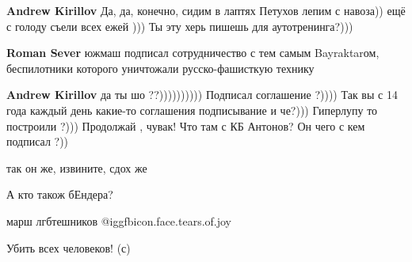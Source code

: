 \begin{itemize}
\begin{itemize}
\textbf{Andrew Kirillov} Да, да, конечно, сидим в лаптях Петухов лепим с навоза)) ещё с голоду съели всех ежей )))
Ты эту херь пишешь для аутотренинга?)))

\textbf{Roman Sever} южмаш подписал сотрудничество с тем самым Bayraktarом, беспилотники которого уничтожали русско-фашисткую технику

\textbf{Andrew Kirillov} да ты шо ??))))))))))
Подписал соглашение ?))))
Так вы с 14 года каждый день какие-то соглашения подписывание и че?)))
Гиперлупу то построили ?)))
Продолжай , чувак!
Что там с КБ Антонов? Он чего с кем подписал ?))

\end{itemize} %

так он же, извините, сдох же

А кто також бЕндера?

марш лгбтешников  @igg{fbicon.face.tears.of.joy} 

Убить всех человеков! (с)

\end{itemize} %
